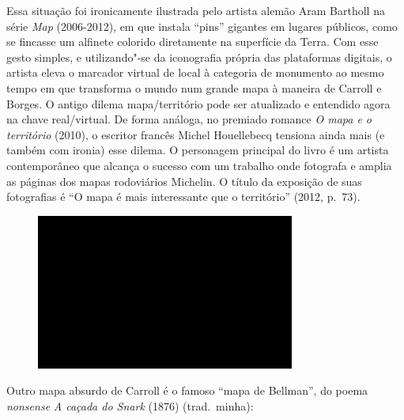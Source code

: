 Essa situação foi ironicamente ilustrada pelo artista alemão Aram
Bartholl na série \emph{Map} (2006-2012), em que instala ``pins''
gigantes em lugares públicos, como se fincasse um alfinete colorido
diretamente na superfície da Terra. Com esse gesto simples, e
utilizando"-se da iconografia própria das plataformas digitais, o artista
eleva o marcador virtual de local à categoria de monumento ao mesmo
tempo em que transforma o mundo num grande mapa à maneira de Carroll e
Borges. O antigo dilema mapa/território pode ser atualizado e entendido
agora na chave real/virtual. De forma análoga, no premiado romance
\emph{O mapa e o território} (2010), o escritor francês Michel
Houellebecq tensiona ainda mais (e também com ironia) esse dilema. O
personagem principal do livro é um artista contemporâneo que alcança o
sucesso com um trabalho onde fotografa e amplia as páginas dos mapas
rodoviários Michelin. O título da exposição de suas fotografias é ``O
mapa é mais interessante que o território'' (2012, p.~73).

\begin{figure}[!ht]

\centering
 \includegraphics[width=85mm]{./imgs/im1.jpg}
\caption{\tiny{}}

\end{figure}

Outro mapa absurdo de Carroll é o famoso ``mapa de Bellman'', do poema
\emph{nonsense} \emph{A caçada do Snark} (1876) (trad.~minha): \label{bellman}

